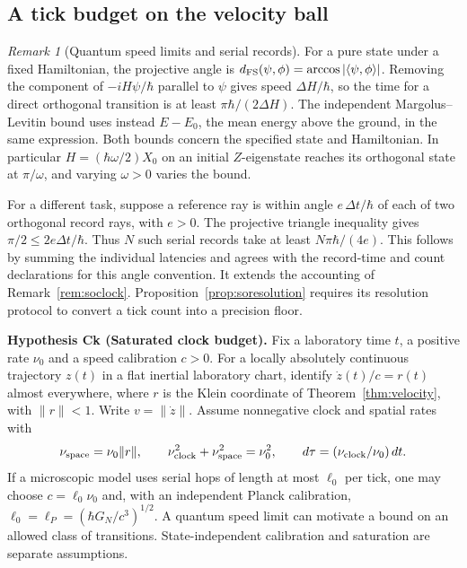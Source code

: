 \documentclass[aps,pra,onecolumn,superscriptaddress,nofootinbib,10pt]{revtex4-2}
\theoremstyle{definition}
\theoremstyle{remark}
\newtheorem{remark}[theorem]{Remark}
\begin{document}
\subsection{A tick budget on the velocity ball}

\begin{remark}[Quantum speed limits and serial records]\label{ub:qsl}
For a pure state under a fixed Hamiltonian, the projective angle is
$d_{\rm FS}(\psi,\phi)=\arccos|\langle\psi,\phi\rangle|$.
Removing the component of $-iH\psi/\hbar$ parallel to $\psi$
gives speed $\Delta H/\hbar$, so the time for a direct orthogonal
transition is at least $\pi\hbar/(2\Delta H)$. The independent
Margolus--Levitin bound uses instead $E-E_0$, the mean energy above the
ground, in the same expression. Both bounds concern the specified
state and Hamiltonian. In particular $H=(\hbar\omega/2)X_0$ on an
initial $Z$-eigenstate reaches its orthogonal state at $\pi/\omega$,
and varying $\omega>0$ varies the bound.
\cite{n4:MT,n4:ML}

For a different task, suppose a reference ray is within angle
$e\,\Delta t/\hbar$ of each of two orthogonal record rays, with $e>0$.
The projective triangle inequality gives
$\pi/2\le 2e\Delta t/\hbar$. Thus $N$ such serial records take
at least $N\pi\hbar/(4e)$. This follows by summing the individual
latencies and agrees with the record-time and count declarations
for this angle convention. It extends the accounting of
Remark~\ref{rem:soclock}. Proposition~\ref{prop:soresolution}
requires its resolution protocol to convert a tick count into a
precision floor.
\end{remark}

\smallskip\noindent\textbf{Hypothesis Ck (Saturated clock budget).}  Fix a laboratory time $t$, a positive rate $\nu_0$ and a speed
calibration $c>0$. For a locally absolutely continuous trajectory
$z(t)$ in a flat inertial laboratory chart, identify
$\dot z(t)/c=r(t)$ almost everywhere, where $r$ is the Klein coordinate
of Theorem~\ref{thm:velocity}, with $\|r\|<1$. Write $v=\|\dot z\|$.
Assume nonnegative clock and spatial rates with
\[
 \nu_{\rm space}=\nu_0\|r\|,\qquad
 \nu_{\rm clock}^2+\nu_{\rm space}^2=\nu_0^2,\qquad
 d\tau=(\nu_{\rm clock}/\nu_0)\,dt .
\]
If a microscopic model uses serial hops of length at most $\ell_0$
per tick, one may choose $c=\ell_0\nu_0$ and, with an independent
Planck calibration, $\ell_0=\ell_P=(\hbar G_N/c^3)^{1/2}$.
A quantum speed limit can motivate a bound on an allowed class of
transitions. State-independent calibration and saturation are
separate assumptions.
\end{document}
